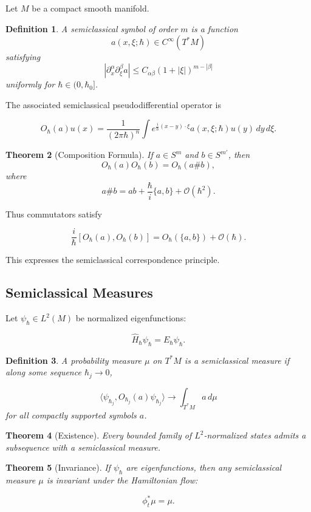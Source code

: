 \documentclass[11pt]{article}
\newtheorem{theorem}{Theorem}[section]
\newtheorem{definition}[theorem]{Definition}
\begin{document}
Let $M$ be a compact smooth manifold.

\begin{definition}
A semiclassical symbol of order $m$ is a function
\[
a(x,\xi;\hbar) \in C^\infty(T^*M)
\]
satisfying
\[
|\partial_x^\alpha \partial_\xi^\beta a|
\le C_{\alpha\beta} (1+|\xi|)^{m-|\beta|}
\]
uniformly for $\hbar \in (0,\hbar_0]$.
\end{definition}

The associated semiclassical pseudodifferential operator is

\[
O_\hbar(a)u(x)
=
\frac{1}{(2\pi\hbar)^n}
\int e^{\frac{i}{\hbar}(x-y)\cdot\xi}
a(x,\xi;\hbar) u(y)\,dy\,d\xi.
\]

\begin{theorem}[Composition Formula]
If $a \in S^m$ and $b \in S^{m'}$, then
\[
O_\hbar(a)O_\hbar(b)
=
O_\hbar(a \# b),
\]
where
\[
a \# b
=
ab
+
\frac{\hbar}{i}\{a,b\}
+
\mathcal{O}(\hbar^2).
\]
\end{theorem}

Thus commutators satisfy

\[
\frac{i}{\hbar}[O_\hbar(a),O_\hbar(b)]
=
O_\hbar(\{a,b\})
+
\mathcal{O}(\hbar).
\]

This expresses the semiclassical correspondence principle.

\subsection{Semiclassical Measures}

Let $\psi_\hbar \in L^2(M)$ be normalized eigenfunctions:

\[
\hat H_\hbar \psi_\hbar = E_\hbar \psi_\hbar.
\]

\begin{definition}
A probability measure $\mu$ on $T^*M$ is a semiclassical measure
if along some sequence $\hbar_j \to 0$,

\[
\langle \psi_{\hbar_j},
O_{\hbar_j}(a)\psi_{\hbar_j}
\rangle
\to
\int_{T^*M} a \, d\mu
\]
for all compactly supported symbols $a$.
\end{definition}

\begin{theorem}[Existence]
Every bounded family of $L^2$-normalized states admits a subsequence
with a semiclassical measure.
\end{theorem}

\begin{theorem}[Invariance]
If $\psi_\hbar$ are eigenfunctions, then any semiclassical measure
$\mu$ is invariant under the Hamiltonian flow:

\[
\phi_t^* \mu = \mu.
\]
\end{theorem}
\end{document}
